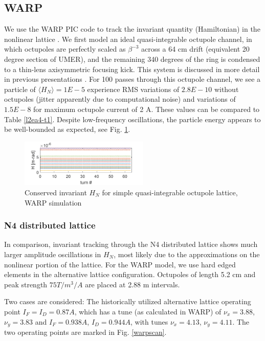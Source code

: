 \subsection{WARP}

We use the WARP PIC code to track the invariant quantity (Hamiltonian) in the nonlinear lattice \cite{warp}. We first model an ideal quasi-integrable octupole channel, in which octupoles are perfectly scaled as $\beta^{-3}$ across a 64 cm drift (equivalent 20 degree section of UMER), and the remaining 340 degrees of the ring is condensed to a thin-lens axisymmetric focusing kick. This system is discussed in more detail in previous presentations \cite{KRAAC}.  For 100 passes through this octupole channel, we see a particle of $\langle H_N\rangle =1E-5$ experience RMS variations of $2.8E-10$ without octupoles (jitter apparently due to computational noise) and variations of $1.5E-8$ for maximum octupole current of 2 A. These values can be compared to Table \ref{l2ea4-t1}. Despite low-frequency oscillations, the particle energy appears to be well-bounded as expected, see Fig. \ref{toyinvar}.

\begin{figure}[!htb]
   \centering
    \includegraphics*[width=174pt]{6.figures/HvsZ_crun1_toylattice}
 	\caption{Conserved invariant $H_N$ for simple quasi-integrable octupole lattice, WARP simulation}
   \label{toyinvar}
\end{figure}


\subsubsection{N4 distributed lattice}

In comparison, invariant tracking through the N4 distributed lattice shows much larger amplitude oscillations in $H_N$, most likely due to the approximations on the nonlinear portion of the lattice. For the WARP model, we use hard edged elements in the alternative lattice configuration. Octupoles of length 5.2 cm and peak strength $75 T/m^3/A$ are placed at 2.88 m intervals. 

Two cases are considered:  The historically utilized alternative lattice operating point $I_F=I_D=0.87 A$, which has a tune (as calculated in WARP) of $\nu_x=3.88$, $\nu_y=3.83$ and $I_F=0.938 A$, $I_D=0.944 A$, with tunes $\nu_x=4.13$, $\nu_y=4.11$. The two operating points are marked in Fig. \ref{warpscan}. 

